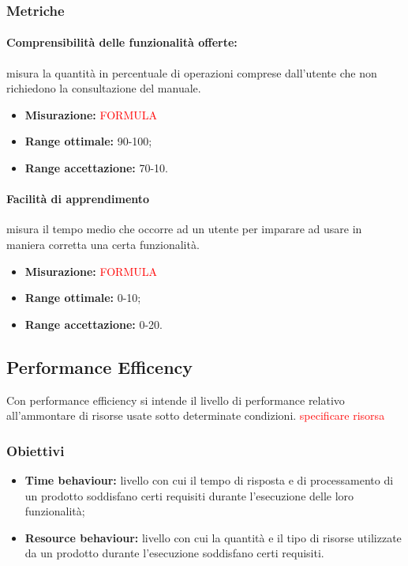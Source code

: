 		\subsubsection{Metriche}
			\paragraph{Comprensibilità delle funzionalità offerte:} misura la quantità in percentuale di operazioni comprese dall'utente che non richiedono la consultazione del manuale.
			\begin{itemize}
				\item {\textbf{Misurazione:} \textcolor{red}{FORMULA}}
				\item {\textbf{Range ottimale:} 90-100;}
				\item {\textbf{Range accettazione:} 70-10.}
			\end{itemize} 
			\paragraph{Facilità di apprendimento} misura il tempo medio che occorre ad un utente per imparare ad usare in maniera corretta una certa funzionalità.
			\begin{itemize}
				\item {\textbf{Misurazione:} \textcolor{red}{FORMULA}}
				\item {\textbf{Range ottimale:} 0-10;}
				\item {\textbf{Range accettazione:} 0-20.}
			\end{itemize} 
			
	\subsection{Performance Efficency}
		Con performance efficiency si intende il livello di performance relativo all'ammontare di risorse usate sotto determinate condizioni. \textcolor{red}{specificare risorsa}
		\subsubsection{Obiettivi}
			\begin{itemize}
				\item {\textbf{Time behaviour:} livello con cui il tempo di risposta e di processamento di un prodotto soddisfano certi requisiti durante l'esecuzione delle loro funzionalità;}
				\item {\textbf{Resource behaviour:} livello con cui la quantità e il tipo di risorse utilizzate da un prodotto durante l'esecuzione soddisfano certi requisiti.}
			\end{itemize}
